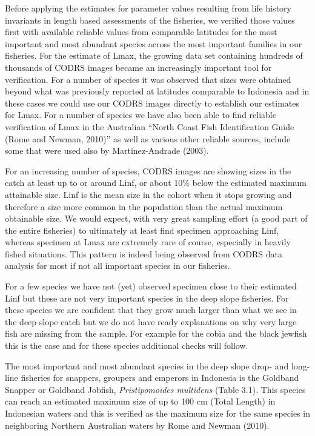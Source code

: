 Before applying the estimates for parameter values resulting from life history invariants in length based assessments of the fisheries, we verified those values first with available reliable values from comparable latitudes for the most important and most abundant species across the most important families in our fisheries. For the estimate of Lmax, the growing data set containing hundreds of thousands of CODRS images became an increasingly important tool for verification. For a number of species it was observed that sizes were obtained beyond what was previously reported at latitudes comparable to Indonesia and in these cases we could use our CODRS images directly to establish our estimates for Lmax. For a number of species we have also been able to find reliable verification of Lmax in the Australian ``North Coast Fish Identification Guide (Rome and Newman, 2010)'' as well as various other reliable sources, include some that were used also by Martinez-Andrade (2003).

For an increasing number of species, CODRS images are showing sizes in the catch at least up to or around Linf, or about 10\% below the estimated maximum attainable size. Linf is the mean size in the cohort when it stops growing and therefore a size more common in the population than the actual maximum obtainable size. We would expect, with very great sampling effort (a good part of the entire fisheries) to ultimately at least find specimen approaching Linf, whereas specimen at Lmax are extremely rare of course, especially in heavily fished situations. This pattern is indeed being observed from CODRS data analysis for most if not all important species in our fisheries.

For a few species we have not (yet) observed specimen close to their estimated Linf but these are not very important species in the deep slope fisheries. For these species we are confident that they grow much larger than what we see in the deep slope catch but we do not have ready explanations on why very large fish are missing from the sample. For example for the cobia and the black jewfish this is the case and for these species additional checks will follow.

The most important and most abundant species in the deep slope drop- and long-line fisheries for snappers, groupers and emperors in Indonesia is the Goldband Snapper or Goldband Jobfish, \textit{Pristipomoides multidens} (Table 3.1). This species can reach an estimated maximum size of up to 100 cm (Total Length) in Indonesian waters and this is verified as the maximum size for the same species in neighboring Northern Australian waters by Rome and Newman (2010).

